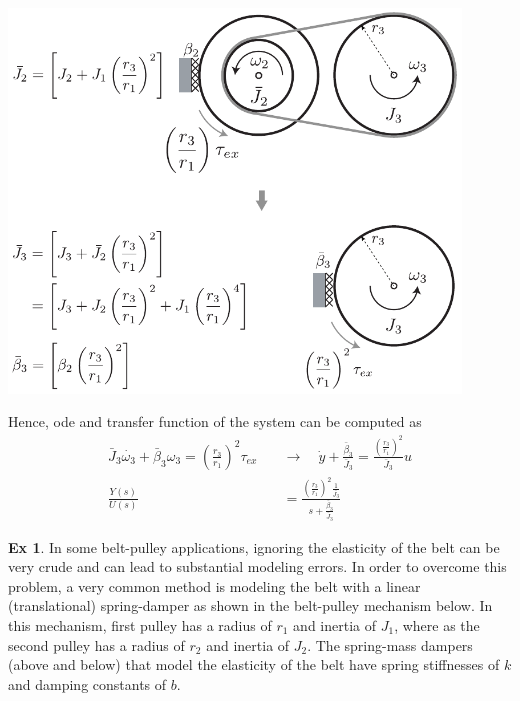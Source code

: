 \documentclass[twoside]{article}
\theoremstyle{definition}
\newtheorem{exmp}[theorem]{Ex}
\begin{document}
    \vspace{12pt}
	
	\begin{minipage}[h]{1\linewidth}
    \begin{center}
      \includegraphics[width=0.9\textwidth]{beltpulleysystem_sol2}
    \end{center}
\end{minipage}
    
Hence, ode and transfer function of the system can be computed as
%
\begin{align*}    
\bar{J}_3 \dot{\omega_3} + \bar{\beta}_3 {\omega}_3 =
  \left( \frac{r_3}{r_1} \right)^2 \tau_{ex}
\quad &\rightarrow \quad 
\dot{y} + \frac{\bar{\beta}_3}{\bar{J}_3} = \frac{\left(
  \frac{r_3}{r_1} \right)^2}{\bar{J}_3} u
\\
\frac{Y(s)}{U(s)} &= \frac{\left(
  \frac{r_3}{r_1} \right)^2 \frac{1}{\bar{J_3}}}{s + \frac{\bar{\beta}_3}{\bar{J}_3}}
\end{align*}


\newpage

\begin{exmp}
In some belt-pulley applications, ignoring the
      elasticity of the belt can be very crude and can lead to 
      substantial modeling errors. 
    In order to overcome this problem, a very common method is modeling the belt with a linear (translational) spring-damper as shown in 
    the belt-pulley mechanism below. In this mechanism, first pulley
    has a radius of $r_1$ and inertia of $J_1$, where as the second pulley 
    has a radius of $r_2$ and inertia of $J_2$. The spring-mass dampers (above and below) that model the elasticity of the belt 
    have spring stiffnesses of $k$ and damping constants of $b$. 
\end{exmp}
    
\end{document}
